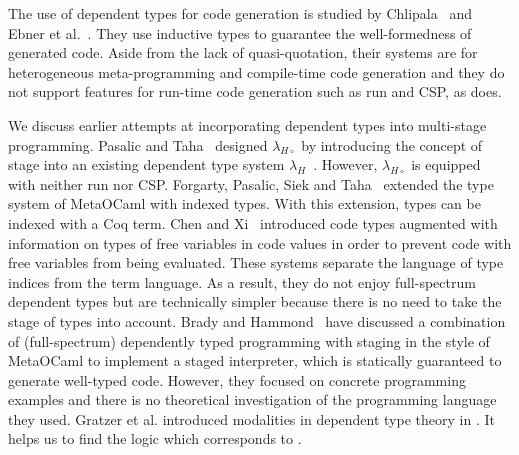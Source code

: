 




The use of dependent types for code generation is studied by
Chlipala~\cite{Chlipala2010Ur} and Ebner et
al.~\cite{DBLP:journals/pacmpl/EbnerURAM17}.  They use inductive types to
guarantee the well-formedness of generated code.  Aside from the lack of
quasi-quotation, their systems are for heterogeneous meta-programming and
compile-time code generation and they do not support features for run-time code
generation such as run and CSP, as \LMD{} does.


We discuss earlier attempts at incorporating dependent types into multi-stage
programming.  Pasalic and Taha~\cite{pasalic2002tagless} designed
\(\lambda_{H\circ}\) by introducing the concept of stage into an existing
dependent type system \(\lambda_H\)~\cite{zhong2002certified}.  However,
\(\lambda_{H\circ}\) is equipped with neither run nor CSP.  Forgarty, Pasalic,
Siek and Taha~\cite{fogarty2007concoqtion} extended the type system of
MetaOCaml with indexed types.  With this extension, types can be indexed with a
Coq term.  Chen and Xi~\cite{chen2003meta} introduced code types augmented with
information on types of free variables in code values in order to prevent code
with free variables from being evaluated.  These systems separate the language
of type indices from the term language.  As a result, they do not enjoy
full-spectrum dependent types but are technically simpler because there is no
need to take the stage of types into account.  Brady and
Hammond~\cite{brady2006dependently} have discussed a combination of
(full-spectrum) dependently typed programming with staging in the style of
MetaOCaml to implement a staged interpreter, which is statically guaranteed to
generate well-typed code.  However, they focused on concrete programming
examples and there is no theoretical investigation of the programming language
they used. Gratzer et al. introduced modalities in dependent type theory in
\cite{gratzer2019modaldependent}. It helps us to find the logic which
corresponds to \LMD.

